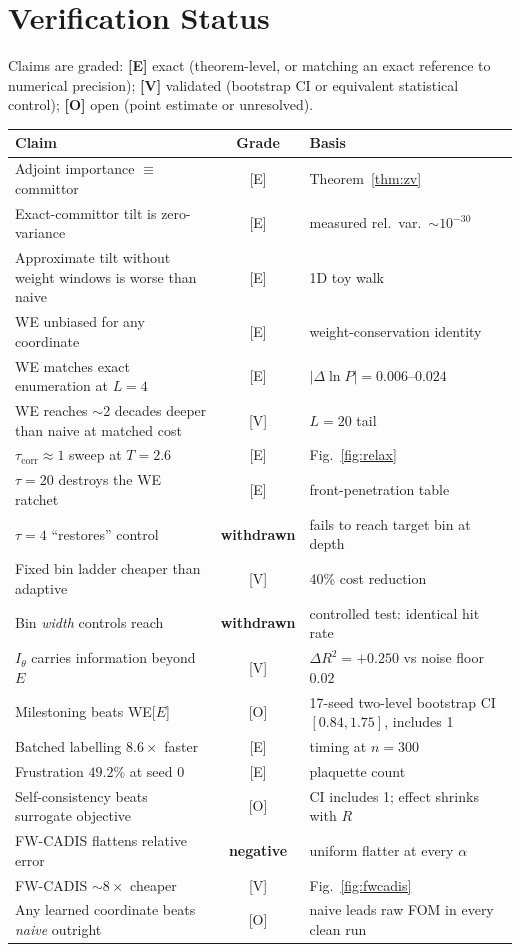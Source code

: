 \documentclass[11pt,a4paper]{article}
\begin{document}
\section{Verification Status}\label{sec:status}

Claims are graded: \textbf{[E]} exact (theorem-level, or matching an exact reference to numerical
precision); \textbf{[V]} validated (bootstrap CI or equivalent statistical control);
\textbf{[O]} open (point estimate or unresolved).

\begin{table}[H]\centering\small
\begin{tabular}{p{7.6cm}cp{5.2cm}}\toprule
\textbf{Claim} & \textbf{Grade} & \textbf{Basis}\\\midrule
Adjoint importance $\equiv$ committor & [E] & Theorem~\ref{thm:zv}\\
Exact-committor tilt is zero-variance & [E] & measured rel.\ var.\ $\sim10^{-30}$\\
Approximate tilt without weight windows is worse than naive & [E] & 1D toy walk\\
WE unbiased for any coordinate & [E] & weight-conservation identity\\
WE matches exact enumeration at $L=4$ & [E] & $|\Delta\ln P|=0.006$--$0.024$\\
WE reaches $\sim$2 decades deeper than naive at matched cost & [V] & $L=20$ tail\\
$\tau_{\mathrm{corr}}\approx1$ sweep at $T=2.6$ & [E] & Fig.~\ref{fig:relax}\\
$\tau=20$ destroys the WE ratchet & [E] & front-penetration table\\
$\tau=4$ ``restores'' control & \textbf{withdrawn} & fails to reach target bin at depth\\
Fixed bin ladder cheaper than adaptive & [V] & 40\% cost reduction\\
Bin \emph{width} controls reach & \textbf{withdrawn} & controlled test: identical hit rate\\
$I_\theta$ carries information beyond $E$ & [V] & $\Delta R^2=+0.250$ vs noise floor $0.02$\\
Milestoning beats WE[$E$] & [O] & 17-seed two-level bootstrap CI $[0.84,1.75]$, includes 1\\
Batched labelling $8.6\times$ faster & [E] & timing at $n=300$\\
Frustration $49.2\%$ at seed 0 & [E] & plaquette count\\
Self-consistency beats surrogate objective & [O] & CI includes 1; effect shrinks with $R$\\
FW-CADIS flattens relative error & \textbf{negative} & uniform flatter at every $\alpha$\\
FW-CADIS $\sim8\times$ cheaper & [V] & Fig.~\ref{fig:fwcadis}\\
Any learned coordinate beats \emph{naive} outright & [O] & naive leads raw FOM in every clean run\\
\bottomrule\end{tabular}
\end{table}
\end{document}
